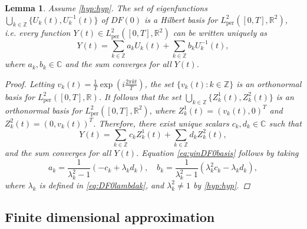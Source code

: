 \documentclass[12pt,reqno]{amsart}
\def\R{{\mathbb R}}
\def\C{{\mathbb C}}
\def\Z{{\mathbb Z}}
\def\per{\textrm{per}}
\newtheorem{lemma}{Lemma}
\begin{document}
\begin{lemma}\label{lemma:DF0basis}
Assume \cref{hyp:hyp}. The set of eigenfunctions $\bigcup_{k \in \Z} \{U_k(t) , U_k^{-1}(t) \}$ of $DF(0)$ is a Hilbert basis for $L^2_\per([0,T],\R^2)$, i.e. every function $Y(t) \in L^2_\per([0,T],\R^2)$ can be written uniquely as
\begin{equation}\label{eq:yinDF0basis}
Y(t) = \sum_{k \in \Z} a_k U_k(t) + \sum_{k \in \Z} b_k U^{-1}_k(t),
\end{equation}
where $a_k, b_k \in \C$ and the sum converges for all $Y(t)$.
\begin{proof}
Letting $v_k(t) = \frac{1}{T} \exp\left( i \frac{2 \pi k t}{T} \right)$, the set $\{ v_k(t) : k \in \Z \}$ is an orthonormal basis for $L^2_\per([0,T],\R)$. It follows that the set $\bigcup_{k \in \Z} \{Z^1_k(t) , Z^2_k(t) \}$ is an orthonormal basis for $L^2_\per([0,T],\R^2)$, where $Z^1_k(t) = (v_k(t), 0)^T$ and $Z^2_k(t) = (0, v_k(t))^T$. Therefore, there exist unique scalars $c_k, d_k \in \C$ such that
\begin{equation*}
Y(t) = \sum_{k \in \Z} c_k Z^1_k(t) + \sum_{k \in \Z} d_k Z^2_k(t),
\end{equation*}
and the sum converges for all $Y(t)$. Equation \cref{eq:yinDF0basis} follows by taking
\[
a_k = \frac{1}{\lambda_k^2 - 1}\left(-c_k + \lambda_k d_k \right), \quad
b_k = \frac{1}{\lambda_k^2 - 1}\left( \lambda_k^2 c_k - \lambda_k d_k \right),
\]
where $\lambda_k$ is defined in \cref{eq:DF0lambdak}, and $\lambda_k^2 \neq 1$ by \cref{hyp:hyp}.
\end{proof}
\end{lemma}

\subsection{Finite dimensional approximation}
\end{document}
